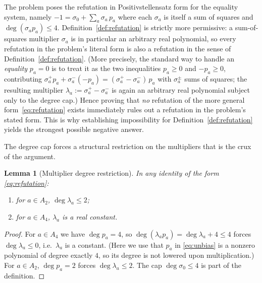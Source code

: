 \documentclass{amsart}
\newtheorem{lemma}{Lemma}
\theoremstyle{definition}
\begin{document}
\begin{remark}\label{rem:subsume}
The problem poses the refutation in Positivstellensatz form for the equality system, namely
$-1=\sigma_0+\sum_a \sigma_a\,p_a$ where each $\sigma_a$ is itself a sum of squares and
$\deg(\sigma_a p_a)\le4$. Definition~\ref{def:refutation} is strictly more permissive: a
sum-of-squares multiplier $\sigma_a$ is in particular an arbitrary real polynomial, so every
refutation in the problem's literal form is also a refutation in the sense of
Definition~\ref{def:refutation}. (More precisely, the standard way to handle an
\emph{equality} $p_a=0$ is to treat it as the two inequalities $p_a\ge0$ and $-p_a\ge0$,
contributing $\sigma_a^{+}p_a+\sigma_a^{-}(-p_a)=(\sigma_a^{+}-\sigma_a^{-})\,p_a$ with
$\sigma_a^{\pm}$ sums of squares; the resulting multiplier
$\lambda_a:=\sigma_a^{+}-\sigma_a^{-}$ is again an arbitrary real polynomial subject only to
the degree cap.) Hence proving that \emph{no} refutation of the more general
form~\eqref{eq:refutation} exists immediately rules out a refutation in the problem's stated
form. This is why establishing impossibility for Definition~\ref{def:refutation} yields the
strongest possible negative answer.
\end{remark}

The degree cap forces a structural restriction on the multipliers that is the crux of the
argument.

\begin{lemma}[Multiplier degree restriction]\label{lem:multdeg}
In any identity of the form \eqref{eq:refutation}:
\begin{enumerate}
\item for $a\in A_2$, $\deg\lambda_a\le 2$;
\item for $a\in A_4$, $\lambda_a$ is a real constant.
\end{enumerate}
\end{lemma}

\begin{proof}
For $a\in A_4$ we have $\deg p_a=4$, so $\deg(\lambda_a p_a)=\deg\lambda_a+4\le 4$ forces
$\deg\lambda_a\le 0$, i.e.\ $\lambda_a$ is a constant. (Here we use that $p_a$ in
\eqref{eq:unbias} is a nonzero polynomial of degree exactly $4$, so its degree is not lowered
upon multiplication.) For $a\in A_2$, $\deg p_a=2$ forces $\deg\lambda_a\le2$. The cap
$\deg\sigma_0\le 4$ is part of the definition. \qedhere
\end{proof}
\end{document}
